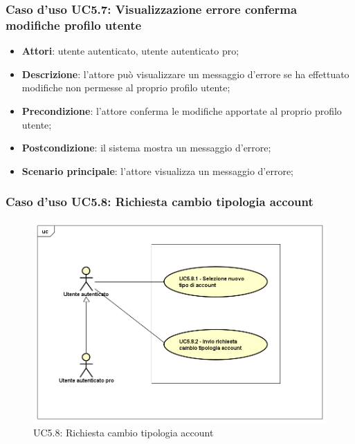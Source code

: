 \subsubsection{Caso d'uso UC5.7: Visualizzazione errore conferma modifiche profilo utente}

\begin{itemize}
	\item \textbf{Attori}:  utente autenticato, utente autenticato pro;
	\item \textbf{Descrizione}: l'attore può visualizzare un messaggio d'errore se ha effettuato modifiche non permesse al proprio profilo utente;
	\item \textbf{Precondizione}: l'attore conferma le modifiche apportate al proprio profilo utente;
	\item \textbf{Postcondizione}: il sistema mostra un messaggio d'errore;
	\item \textbf{Scenario principale}: l'attore visualizza un messaggio d'errore;
\end{itemize}

\subsubsection{Caso d'uso UC5.8: Richiesta cambio tipologia account}
\label{UC5.8}
\begin{figure}[h]
	\centering
	\includegraphics[scale=0.5,keepaspectratio]{UML/UC5_8.png}
	\caption{UC5.8: Richiesta cambio tipologia account}
\end{figure}


